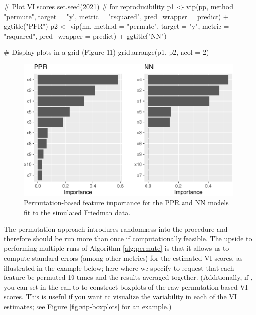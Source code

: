 \begin{Schunk}
\begin{Sinput}
# Plot VI scores
set.seed(2021)  # for reproducibility
p1 <- vip(pp, method = "permute", target = "y", metric = "rsquared",
          pred_wrapper = predict) + ggtitle("PPR")
p2 <- vip(nn, method = "permute", target = "y", metric = "rsquared",
          pred_wrapper = predict) + ggtitle("NN")

# Display plots in a grid (Figure 11)
grid.arrange(p1, p2, ncol = 2)
\end{Sinput}
\begin{figure}[!htb]

{\centering \includegraphics[width=0.7\linewidth]{greenwell-boehmke_files/figure-latex/vip-permute-ppr-nn-1} 

}

\caption[Permutation-based feature importance for the PPR and NN models fit to the simulated Friedman data]{Permutation-based feature importance for the PPR and NN models fit to the simulated Friedman data.}\label{fig:vip-permute-ppr-nn}
\end{figure}
\end{Schunk}

The permutation approach introduces randomness into the procedure and
therefore should be run more than once if computationally feasible. The
upside to performing multiple runs of Algorithm \ref{alg:permute} is
that it allows us to compute standard errors (among other metrics) for
the estimated VI scores, as illustrated in the example below; here where
we specify  to request that each feature be permuted 10
times and the results averaged together. (Additionally, if
, you can set  in the call to
 to construct boxplots of the raw permutation-based VI
scores. This is useful if you want to visualize the variability in each
of the VI estimates; see Figure \ref{fig:vip-boxplots} for an example.)

